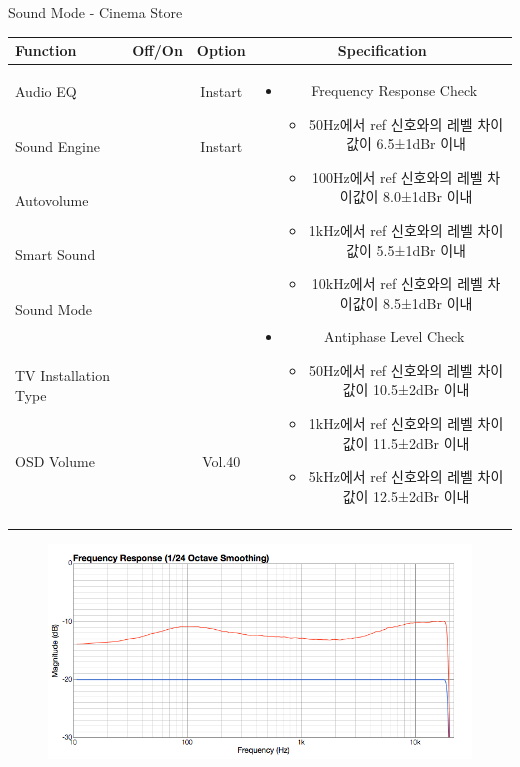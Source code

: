 \begin{frame}[t]{Sound Mode - Cinema Store}
\begin{tiny}
\begin{tabular}{@{}lccc@{}}
\toprule
Function & Off/On & Option & Specification \\
\midrule
Audio EQ & \color{black}{Off} & Instart &
\multirow{10}{60mm}{
\begin{itemize}
\item Frequency Response Check
	\begin{itemize}
	\item 50Hz에서 ref 신호와의 레벨 차이값이 6.5±1dBr 이내
	\item 100Hz에서 ref 신호와의 레벨 차이값이 8.0±1dBr 이내
	\item 1kHz에서 ref 신호와의 레벨 차이값이 5.5±1dBr 이내
	\item 10kHz에서 ref 신호와의 레벨 차이값이 8.5±1dBr 이내
	\end{itemize}
\item Antiphase Level Check
	\begin{itemize}
	\item 50Hz에서 ref 신호와의 레벨 차이값이 10.5±2dBr 이내
	\item 1kHz에서 ref 신호와의 레벨 차이값이 11.5±2dBr 이내
	\item 5kHz에서 ref 신호와의 레벨 차이값이 12.5±2dBr 이내
	\end{itemize}
\end{itemize}
} \\
Sound Engine & \color{blue}{On} & Instart & \\
Autovolume & \color{black}{Off} & & \\
Smart Sound & \color{black}{Off} & & \\
Sound Mode & \color{blue}{On} & \color{blue}{Cinema} & \\
TV Installation Type & \color{blue}{On} & \color{black}{Standtype1} & \\
OSD Volume & \color{blue}{On} & Vol.40 & \\
& & & \\
& & & \\
& & & \\
& & & \\
\midrule
\end{tabular}
\end{tiny}

\begin{figure}[b]
\includegraphics[height=0.4\textwidth]{figures/cinema.png}
\end{figure}

\end{frame}